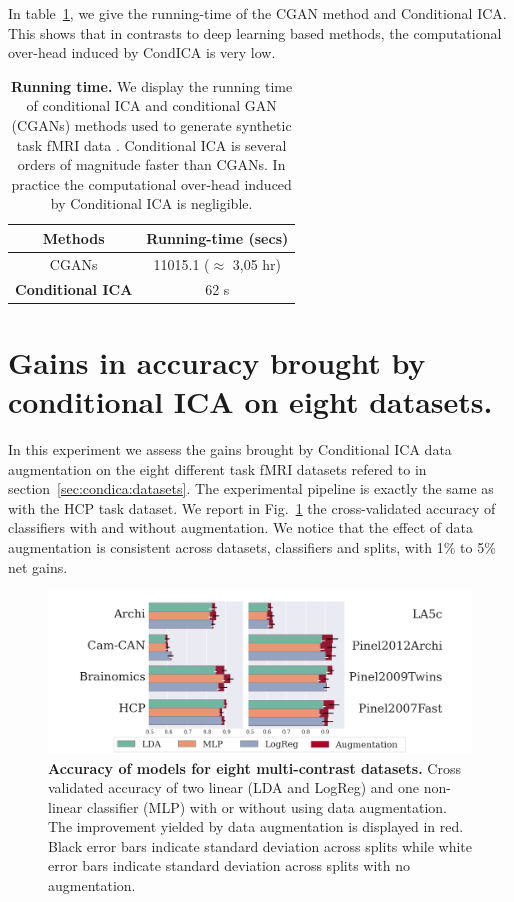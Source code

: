 In table~\ref{app:runningtime:tab}, we give the running-time of the CGAN
method and Conditional ICA. This shows that in contrasts to deep learning based
methods, the computational over-head induced by CondICA is very low.
\begin{table}
  \begin{center}
    \begin{tabular}{|c|c|}
      \hline
      Methods & Running-time (secs)
      \\ \hline
      CGANs  & 11015.1 ($\approx$ 3,05 hr)
      \\
      \textbf{Conditional ICA}  & 62 s 
      \\
      \hline
    \end{tabular}
  \end{center}
  \caption{\textbf{Running time.} We display the running time of conditional ICA
    and conditional GAN (CGANs) methods used
    to generate synthetic task fMRI data . Conditional ICA is several orders of magnitude faster than
    CGANs. In practice the computational over-head induced by Conditional ICA is negligible.}\label{app:runningtime:tab}
\end{table}





\section{Gains in accuracy brought by conditional ICA on eight datasets.}
In this experiment we assess the gains brought by Conditional ICA data
augmentation on the eight different task fMRI datasets refered to in section~\ref{sec:condica:datasets}. The experimental pipeline is exactly the same as with the HCP task dataset.
We report in Fig.~\ref{Fig4} the cross-validated accuracy of
classifiers with and without augmentation.
We notice that the effect of data augmentation is
consistent across datasets, classifiers and splits, with 1\% to 5\% net gains.
%
\begin{figure}
  \centering
  \includegraphics[width=\textwidth]{figures/condica/accuracy_all_datasets_v5.png}
\caption{\textbf{Accuracy of models for eight multi-contrast datasets.} Cross
  validated accuracy of two linear (LDA and LogReg) and one non-linear
  classifier (MLP) with or without using data augmentation.
  The improvement yielded by data augmentation is displayed in red.
  Black error bars indicate standard deviation across splits while white error bars indicate standard deviation across splits with no augmentation.}
\label{Fig4}
\end{figure}
%

